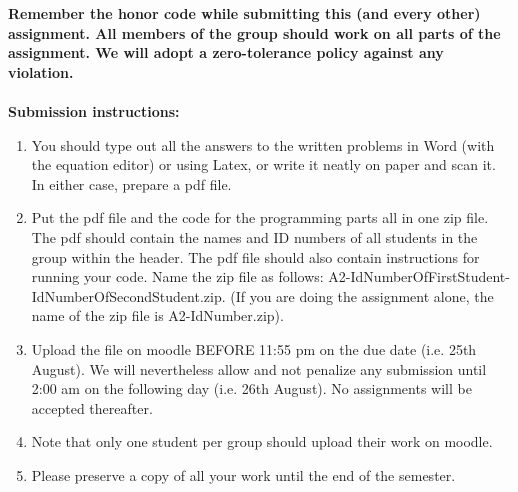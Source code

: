 \documentclass[11pt]{article}
\begin{document}
\maketitle

\textbf{Remember the honor code while submitting this (and every other) assignment. All members of the group should work on all parts of the assignment. We will adopt a \textbf{zero-tolerance policy} against any violation.}
\\
\\
\textbf{Submission instructions:} 
\begin{enumerate}
\item You should type out all the answers to the written problems in Word (with the equation editor) or using Latex, or write it neatly on paper and scan it. In either case, prepare a pdf file. 
\item Put the pdf file and the code for the programming parts all in one zip file. The pdf should contain the names and ID numbers of all students in the group within the header. The pdf file should also contain instructions for running your code. Name the zip file as follows: A2-IdNumberOfFirstStudent-IdNumberOfSecondStudent.zip. (If you are doing the assignment alone, the name of the zip file is A2-IdNumber.zip). 
\item Upload the file on moodle BEFORE 11:55 pm on the due date (i.e. 25th August). We will nevertheless allow and not penalize any submission until 2:00 am on the following day (i.e. 26th August). No assignments will be accepted thereafter. 
\item Note that only one student per group should upload their work on moodle. 
\item Please preserve a copy of all your work until the end of the semester. 
\end{enumerate}
\end{document}
